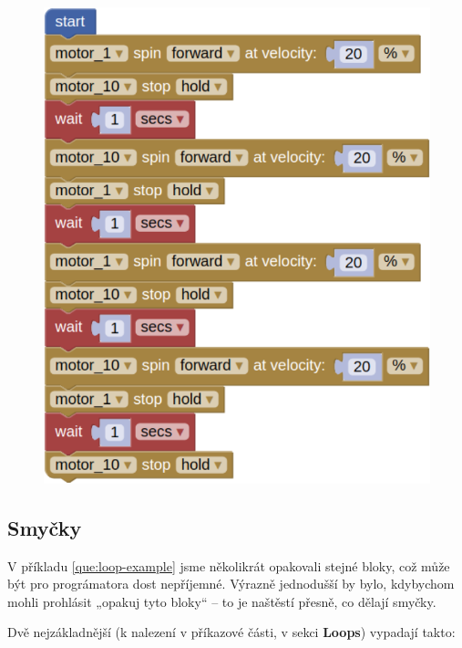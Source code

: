 \documentclass[../main.tex]{subfiles}
\begin{document}
	\begin{solution}
		\begin{figure}
			\centering
			\begin{minipage}{0.5\textwidth}
				\includegraphics[width=\linewidth]{Images/02/sol3.png}
			\end{minipage}
		\end{figure}
	\end{solution}

	\subsection{Smyčky}
	V příkladu \ref{que:loop-example} jsme několikrát opakovali stejné bloky, což může být pro prográmatora dost nepříjemné. Výrazně jednodušší by bylo, kdybychom mohli prohlásit „opakuj tyto bloky“ -- to je naštěstí přesně, co dělají smyčky.

	Dvě nejzákladnější (k nalezení v příkazové části, v sekci \textbf{Loops}) vypadají takto:
	\begin{itemize}
		\blockLoop
		\blockLoopForever
	\end{itemize}
\end{document}
